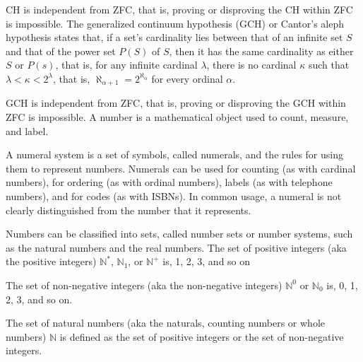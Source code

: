 \documentclass[a4paper,12pt]{report}
\begin{document}
\begin{itemizle}
CH is independent from ZFC, that is, proving or disproving the CH within ZFC is impossible.
The generalized continuum hypothesis (GCH) or Cantor's aleph hypothesis states that, if a set's cardinality lies between that of an infinite set $S$ and that of the power set $P(S)$ of $S$, then it has the same cardinality as either $S$ or $P(s)$, that is, for any infinite cardinal $\lambda$, there is no cardinal $\kappa$ such that $\lambda <\kappa <2^{\lambda }$, that is, $\aleph _{\alpha +1}=2^{\aleph _{\alpha }}$ for every ordinal $\alpha$.

GCH is independent from ZFC, that is, proving or disproving the GCH within ZFC is impossible.
A number is a mathematical object used to count, measure, and label.

A numeral system is a set of symbols, called numerals, and the rules for using them to represent numbers. Numerals can be used for counting (as with cardinal numbers), for ordering (as with ordinal numbers), labels (as with telephone numbers), and for codes (as with ISBNs). In common usage, a numeral is not clearly distinguished from the number that it represents.

Numbers can be classified into sets, called number sets or number systems, such as the natural numbers and the real numbers.
The set of positive integers (aka the positive integers) $\mathbb{N}^*$, $\mathbb{N}_1$, or $\mathbb{N}^+$ is, 1, 2, 3, and so on

The set of non-negative integers (aka the non-negative integers) $\mathbb{N}^0$ or $\mathbb{N}_0$ is, 0, 1, 2, 3, and so on.

The set of natural numbers (aka the naturals, counting numbers or whole numbers) $\mathbb{N}$ is defined as the set of positive integers or the set of non-negative integers.


\end{itemizle}
\end{document}
